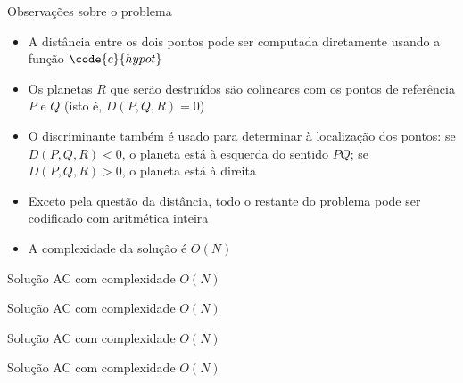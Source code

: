 \begin{frame}[fragile]{Observações sobre o problema}

    \begin{itemize}
        \item A distância entre os dois pontos pode ser computada diretamente usando a função
            $\code{c}{hypot}$

        \item Os planetas $R$ que serão destruídos são colineares com os pontos de referência
            $P$ e $Q$ (isto é, $D(P, Q, R) = 0$)

        \item O discriminante também é usado para determinar à localização dos pontos: se 
            $D(P, Q, R) < 0$, o planeta está à esquerda do sentido $PQ$; se $D(P, Q, R) > 0$,
            o planeta está à direita

        \item Exceto pela questão da distância, todo o restante do problema pode ser codificado
            com aritmética inteira

        \item A complexidade da solução é $O(N)$
    \end{itemize}

\end{frame}

\begin{frame}[fragile]{Solução AC com complexidade $O(N)$}
\end{frame}

\begin{frame}[fragile]{Solução AC com complexidade $O(N)$}
\end{frame}

\begin{frame}[fragile]{Solução AC com complexidade $O(N)$}
\end{frame}

\begin{frame}[fragile]{Solução AC com complexidade $O(N)$}
\end{frame}
